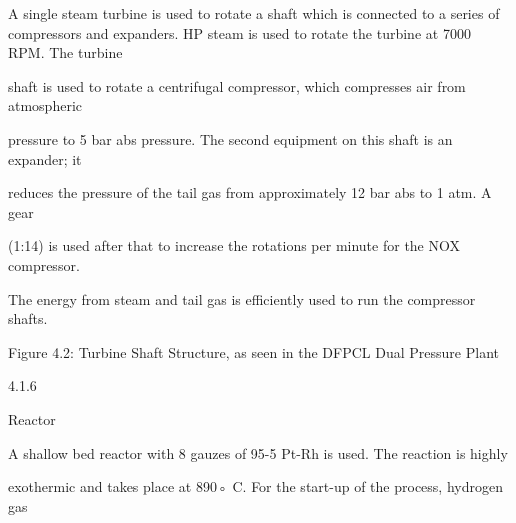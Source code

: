 \documentclass[a4paper,portrait,12pt]{article}
\begin{document}
\begin{flushleft}
A single steam turbine is used to rotate a shaft which is connected to a series of compressors and expanders. HP steam is used to rotate the turbine at 7000 RPM. The turbine
\end{flushleft}


\begin{flushleft}
shaft is used to rotate a centrifugal compressor, which compresses air from atmospheric
\end{flushleft}


\begin{flushleft}
pressure to 5 bar abs pressure. The second equipment on this shaft is an expander; it
\end{flushleft}


\begin{flushleft}
reduces the pressure of the tail gas from approximately 12 bar abs to 1 atm. A gear
\end{flushleft}


\begin{flushleft}
(1:14) is used after that to increase the rotations per minute for the NOX compressor.
\end{flushleft}


\begin{flushleft}
The energy from steam and tail gas is efficiently used to run the compressor shafts.
\end{flushleft}





\begin{flushleft}
Figure 4.2: Turbine Shaft Structure, as seen in the DFPCL Dual Pressure Plant
\end{flushleft}





4.1.6





\begin{flushleft}
Reactor
\end{flushleft}





\begin{flushleft}
A shallow bed reactor with 8 gauzes of 95-5 Pt-Rh is used. The reaction is highly
\end{flushleft}


\begin{flushleft}
exothermic and takes place at 890◦ C. For the start-up of the process, hydrogen gas
\end{flushleft}
\end{document}
